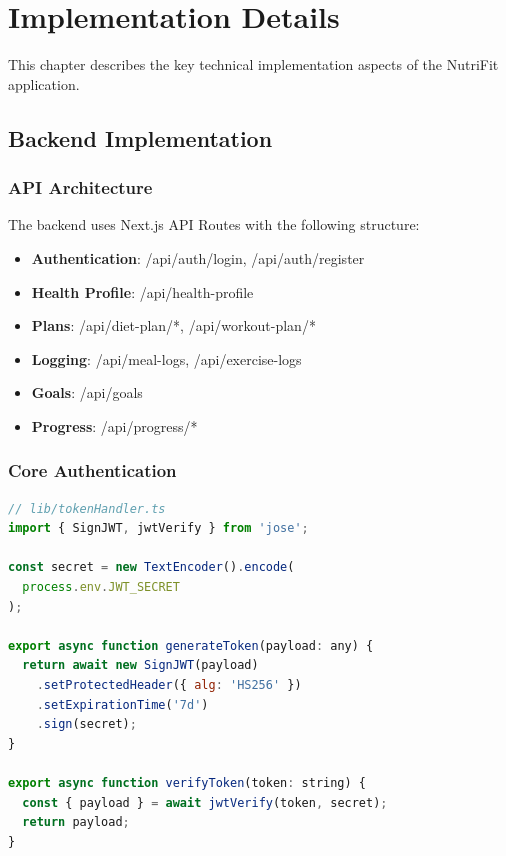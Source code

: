 \chapter{Implementation Details}

This chapter describes the key technical implementation aspects of the NutriFit application.

\section{Backend Implementation}

\subsection{API Architecture}

The backend uses Next.js API Routes with the following structure:

\begin{itemize}
    \item \textbf{Authentication}: /api/auth/login, /api/auth/register
    \item \textbf{Health Profile}: /api/health-profile
    \item \textbf{Plans}: /api/diet-plan/*, /api/workout-plan/*
    \item \textbf{Logging}: /api/meal-logs, /api/exercise-logs
    \item \textbf{Goals}: /api/goals
    \item \textbf{Progress}: /api/progress/*
\end{itemize}

\subsection{Core Authentication}

\begin{lstlisting}[language=JavaScript, caption=JWT Token Generation]
// lib/tokenHandler.ts
import { SignJWT, jwtVerify } from 'jose';

const secret = new TextEncoder().encode(
  process.env.JWT_SECRET
);

export async function generateToken(payload: any) {
  return await new SignJWT(payload)
    .setProtectedHeader({ alg: 'HS256' })
    .setExpirationTime('7d')
    .sign(secret);
}

export async function verifyToken(token: string) {
  const { payload } = await jwtVerify(token, secret);
  return payload;
}
\end{lstlisting}

